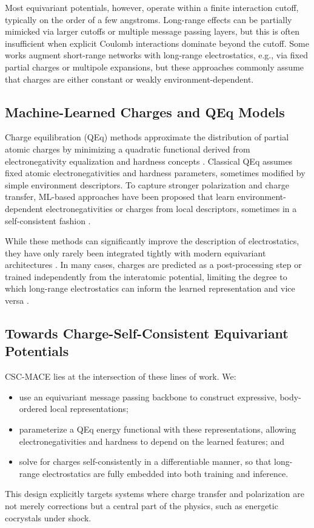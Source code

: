 \documentclass{article}
\begin{document}
Most equivariant potentials, however, operate within a finite interaction cutoff, typically on the order of a few angstroms. Long-range effects can be partially mimicked via larger cutoffs or multiple message passing layers, but this is often insufficient when explicit Coulomb interactions dominate beyond the cutoff. Some works augment short-range networks with long-range electrostatics, e.g., via fixed partial charges or multipole expansions, but these approaches commonly assume that charges are either constant or weakly environment-dependent.

\subsection{Machine-Learned Charges and QEq Models}
\label{sec:qeq_review}

Charge equilibration (QEq) methods approximate the distribution of partial atomic charges by minimizing a quadratic functional derived from electronegativity equalization and hardness concepts \cite{rappe1991charge}. Classical QEq assumes fixed atomic electronegativities and hardness parameters, sometimes modified by simple environment descriptors. To capture stronger polarization and charge transfer, ML-based approaches have been proposed that learn environment-dependent electronegativities or charges from local descriptors, sometimes in a self-consistent fashion \cite{gastegger2017machine,unke2019physnet,ko2021fourth}.

While these methods can significantly improve the description of electrostatics, they have only rarely been integrated tightly with modern equivariant architectures \cite{musil2021physics}. In many cases, charges are predicted as a post-processing step or trained independently from the interatomic potential, limiting the degree to which long-range electrostatics can inform the learned representation and vice versa \cite{goedecker2023perspective}.

\subsection{Towards Charge-Self-Consistent Equivariant Potentials}

CSC-MACE lies at the intersection of these lines of work. We:
\begin{itemize}
    \item use an equivariant message passing backbone to construct expressive, body-ordered local representations;
    \item parameterize a QEq energy functional with these representations, allowing electronegativities and hardness to depend on the learned features; and
    \item solve for charges self-consistently in a differentiable manner, so that long-range electrostatics are fully embedded into both training and inference.
\end{itemize}
This design explicitly targets systems where charge transfer and polarization are not merely corrections but a central part of the physics, such as energetic cocrystals under shock.
\end{document}
